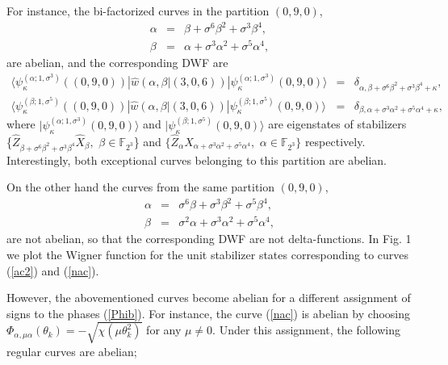 \documentclass{article}
\begin{document}
For instance, the bi-factorized curves in the partition $(0,9,0)$,%
\begin{eqnarray}
\alpha &=&\beta +\sigma ^{6}\beta ^{2}+\sigma ^{3}\beta ^{4},  \label{ac1} \\
\beta &=&\alpha +\sigma ^{3}\alpha ^{2}+\sigma ^{5}\alpha ^{4},  \label{ac2}
\end{eqnarray}%
are abelian, and the corresponding DWF are%
\begin{eqnarray*}
\langle \psi _{\kappa }^{(\alpha ;1,\sigma ^{3})}((0,9,0))|\hat{w}\left(
\alpha ,\beta |(3,0,6)\right) |\psi _{\kappa }^{(\alpha ;1,\sigma
^{3})}(0,9,0)\rangle &=&\delta _{\alpha ,\beta +\sigma ^{6}\beta ^{2}+\sigma
^{3}\beta ^{4}+\kappa }, \\
\langle \psi _{\kappa }^{(\beta ;1,\sigma ^{5})}((0,9,0))|\hat{w}\left(
\alpha ,\beta |(3,0,6)\right) |\psi _{\kappa }^{(\beta ;1,\sigma
^{5})}(0,9,0)\rangle &=&\delta _{\beta ,\alpha +\sigma ^{3}\alpha
^{2}+\sigma ^{5}\alpha ^{4}+\kappa },
\end{eqnarray*}%
where $|\psi _{\kappa }^{(\alpha ;1,\sigma ^{3})}(0,9,0)\rangle $ and $|\psi
_{\kappa }^{(\beta ;1,\sigma ^{5})}(0,9,0)\rangle $ are eigenstates of
stabilizers \{$\hat{Z}_{\beta +\sigma ^{6}\beta ^{2}+\sigma ^{3}\beta ^{4}}%
\hat{X}_{\beta },$ $\beta \in \mathbb{F}_{2^{3}}$\} and $\{\hat{Z}_{\alpha }%
\hat{X}_{\alpha +\sigma ^{3}\alpha ^{2}+\sigma ^{5}\alpha ^{4}},$ $\alpha
\in \mathbb{F}_{2^{3}}\}$ respectively. Interestingly, both exceptional
curves belonging to this partition are abelian.

On the other hand the curves from the same partition $(0,9,0)$,%
\begin{eqnarray}
\alpha &=&\sigma ^{6}\beta +\sigma ^{3}\beta ^{2}+\sigma ^{5}\beta ^{4},
\label{nac1} \\
\beta &=&\sigma ^{2}\alpha +\sigma ^{3}\alpha ^{2}+\sigma ^{5}\alpha ^{4},
\label{nac}
\end{eqnarray}%
are not abelian, so that the corresponding DWF are not delta-functions. In
Fig. 1 we plot the Wigner function for the unit stabilizer states
corresponding to curves (\ref{ac2}) and (\ref{nac}).

However, the abovementioned curves become abelian for a different assignment
of signs to the phases (\ref{Phib}). For instance, the curve (\ref{nac}) is
abelian by choosing $\Phi _{\alpha ,\mu \alpha }(\theta _{k})=-\sqrt{\chi
\left( \mu \theta _{k}^{2}\right) }$ for any $\mu \neq 0$. Under this
assignment, the following regular curves are abelian;
\end{document}
